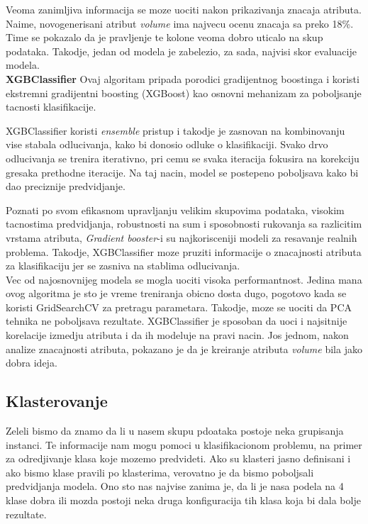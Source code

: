 \documentclass[10pt]{article}
\begin{document}
Veoma zanimljiva informacija se moze uociti nakon prikazivanja znacaja atributa. Naime, novogenerisani atribut \textit{volume} ima najvecu ocenu znacaja sa preko 18\%. Time se pokazalo da je pravljenje te kolone veoma dobro uticalo na skup podataka. Takodje, jedan od modela je zabelezio, za sada, najvisi skor evaluacije modela.\\

\textbf{XGBClassifier}
Ovaj algoritam pripada porodici gradijentnog boostinga i koristi ekstremni gradijentni boosting (XGBoost) kao osnovni mehanizam za poboljsanje tacnosti klasifikacije.

XGBClassifier koristi \textit{ensemble} pristup i takodje je zasnovan na kombinovanju vise stabala odlucivanja, kako bi donosio odluke o klasifikaciji. Svako drvo odlucivanja se trenira iterativno, pri cemu se svaka iteracija fokusira na korekciju gresaka prethodne iteracije. Na taj nacin, model se postepeno poboljsava kako bi dao preciznije predvidjanje.

Poznati po svom efikasnom upravljanju velikim skupovima podataka, visokim tacnostima predvidjanja, robustnosti na sum i sposobnosti rukovanja sa razlicitim vrstama atributa, \textit{Gradient booster}-i su najkorisceniji modeli za resavanje realnih problema. Takodje, XGBClassifier moze pruziti informacije o znacajnosti atributa za klasifikaciju jer se zasniva na stablima odlucivanja.\\


Vec od najosnovnijeg modela se mogla uociti visoka performantnost. Jedina mana ovog algoritma je sto je vreme treniranja obicno dosta dugo, pogotovo kada se koristi GridSearchCV za pretragu parametara. Takodje, moze se uociti da PCA tehnika ne poboljsava rezultate. XGBClassifier je sposoban da uoci i najsitnije korelacije izmedju atributa i da ih modeluje na pravi nacin. Jos jednom, nakon analize znacajnosti atributa, pokazano je da je kreiranje atributa \textit{volume} bila jako dobra ideja.


\newpage
\subsection{Klasterovanje}
Zeleli bismo da znamo da li u nasem skupu pdoataka postoje neka grupisanja instanci. Te informacije nam mogu pomoci u klasifikacionom problemu, na primer za odredjivanje klasa koje mozemo predvideti. Ako su klasteri jasno definisani i ako bismo klase pravili po klasterima, verovatno je da bismo poboljsali predvidjanja modela. Ono sto nas najvise zanima je, da li je nasa podela na 4 klase dobra ili mozda postoji neka druga konfiguracija tih klasa koja bi dala bolje rezultate.\\
\end{document}
